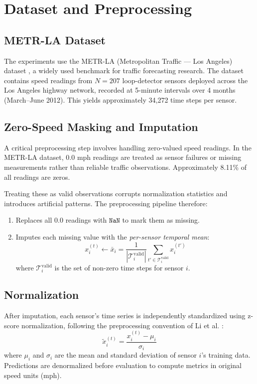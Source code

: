 \section{Dataset and Preprocessing}
\label{sec:dataset}

\subsection{METR-LA Dataset}
The experiments use the METR-LA (Metropolitan Traffic --- Los Angeles) dataset \cite{li2018}, a widely used benchmark for traffic forecasting research. The dataset contains speed readings from $N = 207$ loop-detector sensors deployed across the Los Angeles highway network, recorded at 5-minute intervals over 4 months (March--June 2012). This yields approximately 34,272 time steps per sensor.

\subsection{Zero-Speed Masking and Imputation}
\label{sec:zero_masking}
A critical preprocessing step involves handling zero-valued speed readings. In the METR-LA dataset, $0.0$ mph readings are treated as sensor failures or missing measurements rather than reliable traffic observations. Approximately 8.11\% of all readings are zeros.

Treating these as valid observations corrupts normalization statistics and introduces artificial patterns. The preprocessing pipeline therefore:
\begin{enumerate}
    \item Replaces all $0.0$ readings with $\texttt{NaN}$ to mark them as missing.
    \item Imputes each missing value with the \textit{per-sensor temporal mean}:
    \begin{equation}
    x_i^{(t)} \leftarrow \bar{x}_i = \frac{1}{|\mathcal{T}_i^{\text{valid}}|} \sum_{t' \in \mathcal{T}_i^{\text{valid}}} x_i^{(t')}
    \end{equation}
    where $\mathcal{T}_i^{\text{valid}}$ is the set of non-zero time steps for sensor $i$.
\end{enumerate}

\subsection{Normalization}
After imputation, each sensor's time series is independently standardized using z-score normalization, following the preprocessing convention of Li et al. \cite{li2018}:
\begin{equation}
\tilde{x}_i^{(t)} = \frac{x_i^{(t)} - \mu_i}{\sigma_i}
\end{equation}
where $\mu_i$ and $\sigma_i$ are the mean and standard deviation of sensor $i$'s training data. Predictions are denormalized before evaluation to compute metrics in original speed units (mph).

